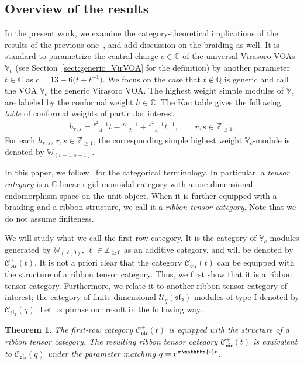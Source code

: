\documentclass[10pt,a4paper]{amsart}
\numberwithin{equation}{section}
\newtheorem{thm}{Theorem}[section]
\newcommand{\bC}{\mathbb{C}}
\newcommand{\bQ}{\mathbb{Q}}
\newcommand{\bZ}{\mathbb{Z}}
\newcommand{\cC}{\mathcal{C}}
\newcommand{\cU}{\mathcal{U}}
\newcommand{\fsl}{\mathfrak{sl}}
\newcommand{\bbmi}{\mathbbm{i}}
\newcommand{\UEA}{\cU}
\newcommand{\Uq}{\UEA_{q}}
\newcommand{\catQG}{\cC_{\fsl_{2}}}
\newcommand{\catVir}{\cC_{\vir}}
\newcommand{\virvoa}{\mathbb{V}}
\newcommand{\virmod}{\mathbb{W}}
\newcommand{\vir}{\mathfrak{vir}}
\begin{document}
\subsection{Overview of the results}
In the present work, we examine the category-theoretical implications of the results of the previous one~\cite{KoshidaKytola2022},
and add discussion on the braiding as well.
It is standard to parametrize the central charge $c\in \bC$ of the universal Virasoro VOAs $\virvoa_{c}$ (see Section~\ref{sect:generic_VirVOA} for the definition)
by another parameter $t\in \bC$ as
$
	c = 13 - 6 \big(t + t^{-1}\big)$.
We focus on the case that $t\not\in\bQ$ is generic and call the VOA $\virvoa_{c}$ the generic Virasoro VOA.
The highest weight simple modules of $\virvoa_{c}$ are labeled by the conformal weight $h\in \bC$.
The Kac table gives the following {\it table} of conformal weights of particular interest
\begin{gather*}
	h_{r,s} = \frac{r^{2}-1}{4}t-\frac{rs-1}{2}+\frac{s^{2}-1}{4}t^{-1},\qquad r,s\in \bZ_{\geq 1}.
\end{gather*}
For each $h_{r,s}$, $r,s\in\bZ_{\geq 1}$, the corresponding simple highest weight $\virvoa_{c}$-module is denoted by $\virmod_{(r-1,s-1)}$.

In this paper, we follow~\cite{etingof2015tensor} for the categorical terminology.
In particular, a {\it tensor category} is a $\bC$-linear rigid monoidal category
with a one-dimensional endomorphism space on the unit object.
When it is further equipped with a braiding and a ribbon structure, we call it a {\it ribbon tensor category}.
Note that we do not assume finiteness.

We will study what we call the first-row category.
It is the category of $\virvoa_{c}$-modules generated by $\virmod_{(\ell,0)}$, $\ell \in\bZ_{\geq 0}$ as an additive category,
and will be denoted by $\catVir^{+}(t)$.
It is not a priori clear that the category $\catVir^{+}(t)$ can be equipped with the structure of a ribbon tensor category.
Thus, we first show that it is a ribbon tensor category.
Furthermore, we relate it to another ribbon tensor category of interest;
the category of finite-dimensional $\Uq(\fsl_{2})$-modules of type I denoted by $\catQG (q)$.
Let us phrase our result in the following way.


\begin{thm}
\label{thm:first-row-cat_QG}
The first-row category $\catVir^{+}(t)$ is equipped with the structure of a ribbon tensor category.
The resulting ribbon tensor category $\catVir^{+}(t)$ is equivalent to $\catQG(q)$
under the parameter matching $q = {\rm e}^{\pi \bbmi t}$.
\end{thm}
\end{document}
